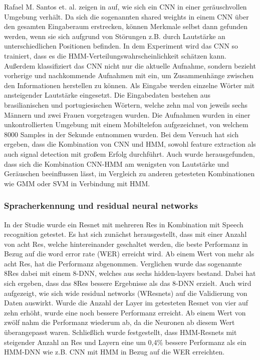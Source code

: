 Rafael M. Santos et. al. zeigen in \cite{noisycnn} auf, wie sich ein CNN in einer geräuschvollen Umgebung verhält. Da sich die sogenannten shared weights in einem CNN über den gesamten Eingaberaum erstrecken, können Merkmale selbst dann gefunden werden, wenn sie sich aufgrund von Störungen z.B. durch Lautstärke an unterschiedlichen Positionen befinden. In dem Experiment wird das CNN so trainiert, dass es die HMM-Verteilungswahrscheinlichkeit schätzen kann. Außerdem klassifiziert das CNN nicht nur die aktuelle Aufnahme, sondern bezieht vorherige und nachkommende Aufnahmen mit ein, um Zusammenhänge zwischen den Informationen herstellen zu können. Als Eingabe werden einzelne Wörter mit ansteigender Lautstärke eingesetzt. Die Eingabedaten bestehen aus brasilianischen und portugiesischen Wörtern, welche zehn mal von jeweils sechs Männern und zwei Frauen vorgetragen wurden. Die Aufnahmen wurden in einer unkontrollierten Umgebung mit einem Mobiltelefon aufgezeichnet, von welchem 8000 Samples in der Sekunde entnommen wurden. Bei dem Versuch hat sich ergeben, dass die Kombination von CNN und HMM, sowohl feature extraction als auch signal detection mit großem Erfolg durchführt. Auch wurde herausgefunden, dass sich die Kombination CNN-HMM am wenigsten von Lautstärke und Geräuschen beeinflussen lässt, im Vergleich zu anderen getesteten Kombinationen wie GMM \cite{svmgmm} oder SVM \cite{svmgmm} in Verbindung mit HMM.

\subsubsection{Spracherkennung und residual neural networks}
In der Studie \cite{residualnn} wurde ein Resnet mit mehreren Res in Kombination mit Speech recognition getestet. Es hat sich zunächst herausgestellt, dass mit einer Anzahl von acht Res, welche hintereinander geschaltet werden, die beste Performanz in Bezug auf die word error rate (WER) erreicht wird. Ab einem Wert von mehr als acht Res, hat die Performanz abgenommen. Verglichen wurde das sogenannte 8Res dabei mit einem 8-DNN, welches aus sechs hidden-layers bestand. Dabei hat sich ergeben, dass das 8Res bessere Ergebnisse als das 8-DNN erzielt. Auch wird aufgezeigt, wie sich wide residual networks (WResnets) auf die Validierung von Daten auswirkt. Wurde die Anzahl der Layer im getesteten Resnet von vier auf zehn erhöht, wurde eine noch bessere Performanz erreicht. Ab einem Wert von zwölf nahm die Performanz wiederum ab, da die Neuronen ab diesem Wert überangepasst waren. Schließlich wurde festgestellt, dass HMM-Resnets mit steigender Anzahl an Res und Layern eine um 0,4\% bessere Performanz als ein HMM-DNN \cite{residualnn} wie z.B. CNN mit HMM in Bezug auf die WER erreichten.


